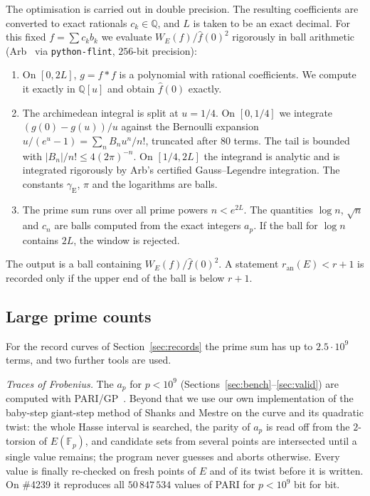 \documentclass[11pt]{amsart}
\theoremstyle{remark}
\theoremstyle{definition}
\newcommand{\Q}{\mathbb{Q}}
\newcommand{\ran}{r_{\mathrm{an}}}
\begin{document}
The optimisation is carried out in double precision. The resulting coefficients are converted to exact rationals $c_k\in\Q$, and $L$ is taken to be an exact decimal. For this fixed $f=\sum c_k b_k$ we evaluate $W_E(f)/\hat f(0)^2$ rigorously in ball arithmetic (Arb~\cite{Arb} via \texttt{python-flint}, $256$-bit precision):
\begin{enumerate}
\item On $[0,2L]$, $g=f*f$ is a polynomial with rational coefficients. We compute it exactly in $\Q[u]$ and obtain $\hat f(0)$ exactly.
\item The archimedean integral is split at $u=1/4$. On $[0,1/4]$ we integrate $(g(0)-g(u))/u$ against the Bernoulli expansion $u/(e^u-1)=\sum_n B_n u^n/n!$, truncated after $80$ terms. The tail is bounded with $|B_n|/n!\le 4(2\pi)^{-n}$. On $[1/4,2L]$ the integrand is analytic and is integrated rigorously by Arb's certified Gauss--Legendre integration. The constants $\gamma_{\mathrm E}$, $\pi$ and the logarithms are balls.
\item The prime sum runs over all prime powers $n<e^{2L}$. The quantities $\log n$, $\sqrt n$ and $c_n$ are balls computed from the exact integers $a_p$. If the ball for $\log n$ contains $2L$, the window is rejected.
\end{enumerate}
The output is a ball containing $W_E(f)/\hat f(0)^2$. A statement $\ran(E)<r+1$ is recorded only if the upper end of the ball is below $r+1$.

\subsection*{Large prime counts}
For the record curves of Section~\ref{sec:records} the prime sum has up to $2.5\cdot10^9$ terms, and two further tools are used.

\emph{Traces of Frobenius.} The $a_p$ for $p<10^9$ (Sections~\ref{sec:bench}--\ref{sec:valid}) are computed with PARI/GP~\cite{PARI}. Beyond that we use our own implementation of the baby-step giant-step method of Shanks and Mestre on the curve and its quadratic twist: the whole Hasse interval is searched, the parity of $a_p$ is read off from the $2$-torsion of $E(\mathbb F_p)$, and candidate sets from several points are intersected until a single value remains; the program never guesses and aborts otherwise. Every value is finally re-checked on fresh points of $E$ and of its twist before it is written. On \#4239 it reproduces all $50\,847\,534$ values of PARI for $p<10^9$ bit for bit.
\end{document}
